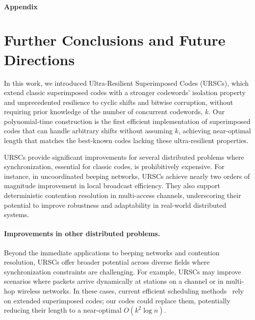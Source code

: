 \documentclass[11pt]{article}
\begin{document}
\fi








\appendix

\ \\

\begin{center}
{\bf\Large Appendix}
\end{center}



\section{Further Conclusions and Future Directions}
\label{sec:final}

In this work, we introduced Ultra-Resilient Superimposed Codes (URSCs), which extend 
classic superimposed codes with a stronger codewords' isolation property 
and unprecedented resilience to cyclic shifts and bitwise corruption, without requiring prior 
knowledge of the number of concurrent codewords, $k$. Our polynomial-time construction is the first efficient 
implementation of superimposed codes that can handle arbitrary shifts without assuming $k$, 
achieving near-optimal length that matches the best-known codes lacking these ultra-resilient properties.

URSCs provide significant improvements for several distributed 
problems where synchronization, essential for classic codes, is prohibitively expensive. 
For instance, in uncoordinated beeping networks, URSCs achieve nearly two orders of magnitude improvement 
in local broadcast efficiency. They also support deterministic contention resolution in multi-access channels, underscoring their potential to improve robustness and adaptability in real-world distributed systems.

\B
\paragraph{Improvements in other distributed problems.}
Beyond the immediate applications to beeping networks and contention resolution, URSCs offer broader 
potential across diverse fields where synchronization constraints are challenging. For example, 
URSCs may improve scenarios where packets arrive dynamically at stations on a channel or in 
multi-hop wireless networks. In these cases, current efficient scheduling methods~\cite{CholviGJK22} 
rely on extended superimposed codes; our codes could replace them, potentially reducing their length to a near-optimal 
$O(k^2 \log n)$.
\end{document}
